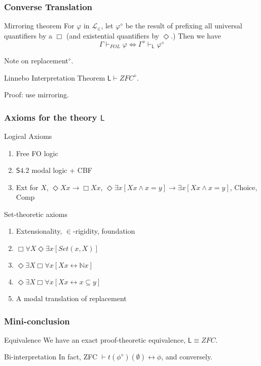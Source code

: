 \documentclass{beamer}
\begin{document}
\begin{frame}
    \frametitle{Converse Translation}
\begin{block}{Mirroring theorem}
 For $\varphi$ in $\mathcal{L}_\in$, let $\varphi^\diamond$ be the result of 
prefixing all universal quantifiers by a $\Box$ 
(and existential quantifiers by $\Diamond$.) Then we have 
\[
    \Gamma \vdash_{FOL} \varphi 
    \Leftrightarrow 
    \Gamma^\diamond \vdash_{\mathsf{L}} \varphi^\diamond
\]
\end{block}
 Note on replacement$^\diamond$.
\begin{block}{Linnebo Interpretation Theorem}
  $\mathsf{L} \vdash ZFC^\diamond$.  
\end{block}
 Proof: use mirroring.
\end{frame}
\begin{frame}
    \frametitle{Axioms for the theory $\mathsf{L}$}
    \begin{block}{Logical Axioms}
    \begin{enumerate}
        \item Free FO logic
        \item $\mathsf{S4.2}$ modal logic + CBF
        \item Ext for $X$, $\Diamond Xx \rightarrow \Box Xx$, 
        $\Diamond \exists x[Xx \wedge x = y] \rightarrow \exists x[Xx \wedge x = y]$,
        Choice, Comp
    \end{enumerate}
    \end{block}
    \begin{block}{Set-theoretic axioms}
        \begin{enumerate}
        \item Extensionality, $\in$-rigidity, foundation
        \item $\Box \forall X \Diamond \exists x [Set(x, X)]$
        \item $\Diamond \exists X \Box \forall x[Xx \leftrightarrow \mathbb{N}x]$
        \item $\Diamond \exists X \Box \forall x[Xx \leftrightarrow x \subseteq y]$
        \item A modal translation of replacement
        \end{enumerate}
    \end{block}
\end{frame}

\begin{frame}
    \frametitle{Mini-conclusion}
\begin{block}{Equivalence}
    We have an exact proof-theoretic equivalence, $\mathsf{L} \equiv ZFC$.
\end{block}
\begin{block}{Bi-interpretation}
    In fact, ZFC $\vdash t(\phi^\diamond)(\emptyset) \leftrightarrow \phi$, and conversely.
\end{block}
\end{frame}
\end{document}
